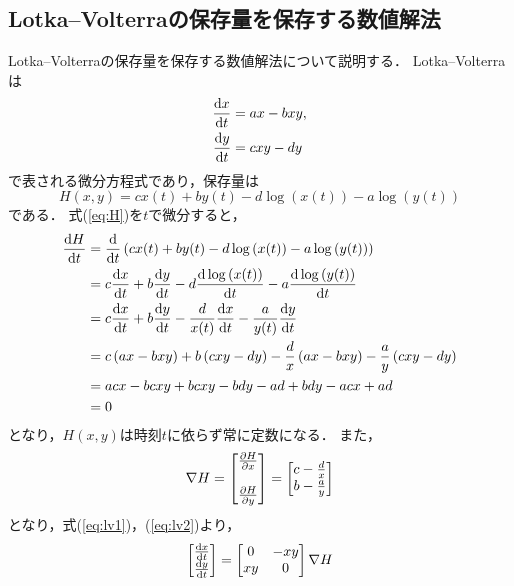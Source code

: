 \subsection{Lotka--Volterraの保存量を保存する数値解法}
Lotka--Volterraの保存量を保存する数値解法について説明する．
Lotka--Volterraは
\begin{align}
    \label{eq:lv1}
    \frac{\mathrm{d}x}{\mathrm{d}t} &= a x - b xy,\\
    \label{eq:lv2}
    \frac{\mathrm{d}y}{\mathrm{d}t} &= c xy - d y
\end{align}
で表される微分方程式であり，保存量は
\begin{equation}
    \label{eq:H}
    H(x,y) = cx(t) + by(t) - d\log\left(x(t)\right) - a\log\left(y(t)\right)
\end{equation}
である．
式(\ref{eq:H})を$t$で微分すると，
\begin{align}
    \frac{\mathrm{d}H}{\mathrm{d}t} &= \frac{\mathrm{d}}{\mathrm{d}t}\left(cx(t) + by(t) - d\log\left(x(t)\right) - a\log\left(y(t)\right)\right) \\
    &= c\frac{\mathrm{d}x}{\mathrm{d}t} + b\frac{\mathrm{d}y}{\mathrm{d}t} - d\frac{\mathrm{d}\log\left(x(t)\right)}{\mathrm{d}t} - a\frac{\mathrm{d}\log\left(y(t)\right)}{\mathrm{d}t} \\
    &= c\frac{\mathrm{d}x}{\mathrm{d}t} + b\frac{\mathrm{d}y}{\mathrm{d}t} - \frac{d}{x(t)}\frac{\mathrm{d}x}{\mathrm{d}t} - \frac{a}{y(t)}\frac{\mathrm{d}y}{\mathrm{d}t} \\
    &= c\left(ax - bxy\right) + b\left(cxy - dy\right) - \frac{d}{x}\left(ax - bxy\right) - \frac{a}{y}\left(cxy - dy\right) \\
    &= acx - bcxy + bcxy - bdy - ad + bdy - acx + ad \\
    &= 0
\end{align}
となり，$H(x,y)$は時刻$t$に依らず常に定数になる．
また，
\begin{align}
    \nabla H = \begin{bmatrix}
        \frac{\partial H}{\partial x} \\  \\
        \frac{\partial H}{\partial y}
    \end{bmatrix} =
    \begin{bmatrix}
        c - \frac{d}{x} \\
        b - \frac{a}{y}
    \end{bmatrix}
\end{align}
となり，式(\ref{eq:lv1})，(\ref{eq:lv2})より，
\begin{align}
    \label{eq:lv3}
    \begin{bmatrix}
        \frac{\mathrm{d}x}{\mathrm{d}t} \\ 
        \frac{\mathrm{d}y}{\mathrm{d}t}
    \end{bmatrix}
    = 
    \begin{bmatrix}
        0 & -xy \\
        xy & 0
    \end{bmatrix}
    \nabla H
\end{align}
